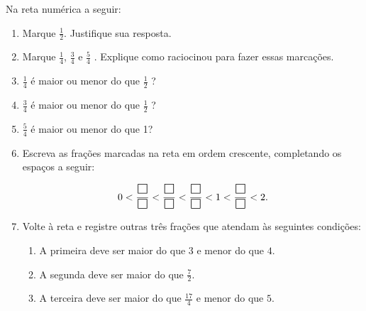 \begin{atividade}{}\label{chap3-ativ18}


  Na reta numérica a seguir:

  
\begin{center}
\end{center}

\begin{enumerate} %
  \item     Marque     $\frac{1}{2}$. Justifique sua resposta.
  \item     Marque     $\frac{1}{4}$,     $\frac{3}{4}$     e     $\frac{5}{4}$    . Explique como raciocinou para fazer essas marcações.

  \item $\frac{1}{4}$     é maior ou menor do que     $\frac{1}{2}$    ?
  \item $\frac{3}{4}$ é maior ou menor do que $\frac{1}{2}$    ?
  \item $\frac{5}{4}$   é maior ou menor do que 1?
  \item Escreva as frações marcadas na reta em ordem crescente, completando os espaços a seguir:

$$0 <  \dfrac{\text{\Large $\square$}}{\text{\Large $\square$}} <  \dfrac{\text{\Large $\square$}}{\text{\Large $\square$}} < \dfrac{\text{\Large $\square$}}{\text{\Large $\square$}} < 1 < \dfrac{\text{\Large $\square$}}{\text{\Large $\square$}}< 2.$$

\item Volte à reta e registre outras três frações que atendam às seguintes condições:
  \begin{enumerate}
  \item A primeira deve ser maior do que $3$ e menor do que $4$.
 \item A segunda deve ser maior do que $\frac{7}{2}$.
 \item A terceira deve ser maior do que $\frac{17}{4}$ e menor do que $5$.
\end{enumerate}
\end{enumerate} %
\end{atividade}

